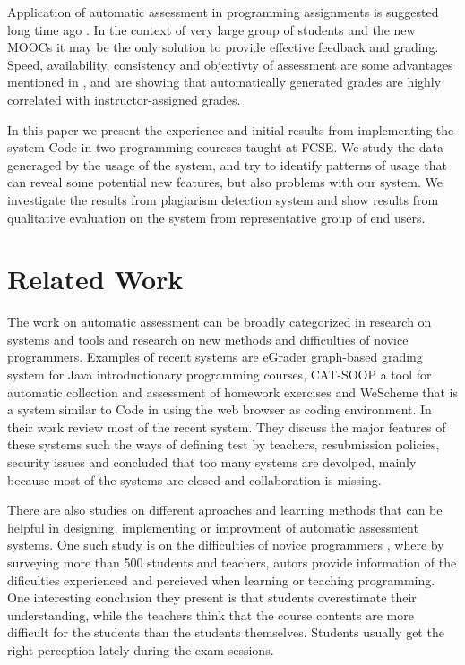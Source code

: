 \documentclass{llncs}
\begin{document}
Application of automatic assessment in programming assignments is suggested long
time ago \cite{hollingsworth1960automatic}. In the context of very large group
of students and the new MOOCs it may be the only solution to provide effective
feedback and grading. Speed, availability, consistency and objectivty of
assessment are some advantages mentioned in \cite{ala2005survey}, and
\cite{vujovsevic2013software} are showing that automatically generated grades
are highly correlated with instructor-assigned grades.

In this paper we present the experience and initial results from
implementing the system Code in two programming coureses taught at FCSE. We
study the data generaged by the usage of the system, and try to identify
patterns of usage that can reveal some potential new features, but also problems
with our system. We investigate the results from plagiarism detection system and
show results from qualitative evaluation on the system from representative group
of end users.

\section{Related Work}

The work on automatic assessment can be broadly categorized in research on
systems and tools and research on new methods and difficulties of novice
programmers. Examples of recent systems are eGrader \cite{shamsi2012intelligent}
graph-based grading system for Java introductionary programming courses,
CAT-SOOP \cite{hartz2012cat} a tool for automatic collection and assessment of
homework exercises and WeScheme \cite{yoo2011wescheme} that is a system
similar to Code \cite{delev2012lab} in using the web browser as coding
environment. In their work \cite{ihantola2010review} review most of the recent system.
They discuss the major features of these systems such the ways of defining test
by teachers, resubmission policies, security issues and concluded that too many
systems are devolped, mainly because most of the systems are closed and
collaboration is missing.

There are also studies on different aproaches and learning methods that can be
helpful in designing, implementing or improvment of automatic assessment
systems. One such study is on the difficulties of novice programmers
\cite{lahtinen2005study}, where by surveying more than 500 students and
teachers, autors provide information of the dificulties experienced and
percieved when learning or teaching programming. One interesting conclusion they present is
that students overestimate their understanding, while the teachers think that
the course contents are more difficult for the students than the students
themselves. Students usually get the right perception lately during the exam
sessions.
\end{document}
